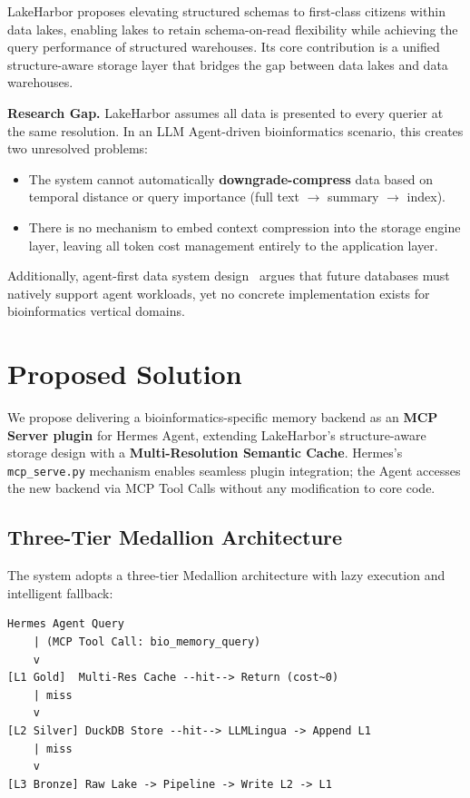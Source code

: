 \documentclass[sigconf]{acmart}
\begin{document}
LakeHarbor proposes elevating structured schemas to first-class citizens within data lakes, enabling lakes to retain schema-on-read flexibility while achieving the query performance of structured warehouses. Its core contribution is a unified structure-aware storage layer that bridges the gap between data lakes and data warehouses.

\textbf{Research Gap.} LakeHarbor assumes all data is presented to every querier at the same resolution. In an LLM Agent-driven bioinformatics scenario, this creates two unresolved problems:

\begin{itemize}
  \item The system cannot automatically \textbf{downgrade-compress} data based on temporal distance or query importance (full text $\rightarrow$ summary $\rightarrow$ index).
  \item There is no mechanism to embed context compression into the storage engine layer, leaving all token cost management entirely to the application layer.
\end{itemize}

Additionally, agent-first data system design~\cite{aioverlords2025} argues that future databases must natively support agent workloads, yet no concrete implementation exists for bioinformatics vertical domains.

\section{Proposed Solution}

We propose delivering a bioinformatics-specific memory backend as an \textbf{MCP Server plugin} for Hermes Agent, extending LakeHarbor's structure-aware storage design with a \textbf{Multi-Resolution Semantic Cache}. Hermes's \texttt{mcp\_serve.py} mechanism enables seamless plugin integration; the Agent accesses the new backend via MCP Tool Calls without any modification to core code.

\subsection{Three-Tier Medallion Architecture}

The system adopts a three-tier Medallion architecture with lazy execution and intelligent fallback:

\begin{verbatim}
Hermes Agent Query
    | (MCP Tool Call: bio_memory_query)
    v
[L1 Gold]  Multi-Res Cache --hit--> Return (cost~0)
    | miss
    v
[L2 Silver] DuckDB Store --hit--> LLMLingua -> Append L1
    | miss
    v
[L3 Bronze] Raw Lake -> Pipeline -> Write L2 -> L1
\end{verbatim}
\end{document}
